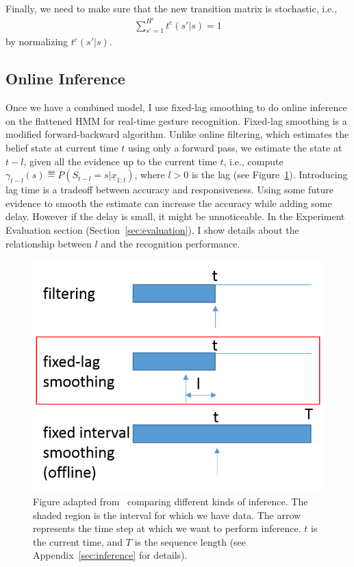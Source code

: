 Finally, we need to make sure that the new transition matrix is stochastic,
i.e., 
\begin{align*}
\sum_{s' = 1}^{H^c} t^c(s'|s) = 1
\end{align*}
by normalizing $t^c(s'|s)$.

\subsection{Online Inference}
Once we have a combined model, I use fixed-lag smoothing \cite{murphy02} to do
online inference on the flattened HMM for real-time gesture recognition.
Fixed-lag smoothing is a modified forward-backward algorithm. Unlike online
filtering, which estimates the belief state at current time $t$ using
only a forward pass, we estimate the state at $t - l$, given all the
evidence up to the current time $t$, i.e., compute $\gamma_{t - l}(s) \eqdef P(S_{t -
l} = s|\underline{x}_{1:t})$, where $l > 0$ is the lag (see
Figure~\ref{fig:inference}).
Introducing lag time is a tradeoff between accuracy and responsiveness. Using some future evidence to
smooth the estimate can increase the accuracy while adding some delay. However
if the delay is small, it might be unnoticeable.
In the Experiment Evaluation section (Section~\ref{sec:evaluation}), I show
details about the relationship between $l$ and the recognition performance.

\begin{figure}[tbh]
\centering
\includegraphics[width=0.5\columnwidth]{figures/inference.png}
\caption{Figure adapted from~\cite{murphy02} comparing different kinds of
inference. The shaded region is the interval for which we have data. The arrow
represents the time step at which we want to perform inference. $t$ is the
current time, and $T$ is the sequence length (see Appendix~\ref{sec:inference}
for details).}
\label{fig:inference}
\end{figure}

